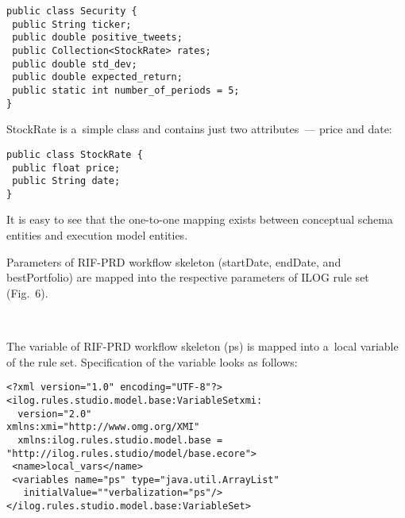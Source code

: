 \begin{multicols}{2}
{\vspace*{-2pt}

\noindent
  \begin{verbatim}
public class Security {
 public String ticker;
 public double positive_tweets;
 public Collection<StockRate> rates;
 public double std_dev;
 public double expected_return;
 public static int number_of_periods = 5;
}	
\end{verbatim}

\vspace*{-2pt}

{\sf StockRate} is a~simple class and contains just two attributes~--- price and date:

\vspace*{-2pt}

\noindent
  \begin{verbatim}
public class StockRate {
 public float price;
 public String date;
}
\end{verbatim}

\vspace*{-2pt}

  It is easy to see that the one-to-one mapping exists between conceptual schema
entities and execution model entities.

  Parameters of RIF-PRD workflow skeleton ({\sf startDate}, {\sf endDate}, and
{\sf bestPortfolio}) are mapped into the respective parameters of ILOG rule set
(Fig.~6).

\begin{figure*} %
\vspace*{1pt}
 \begin{center}
 \mbox{%
 \epsfxsize=115mm
 }
 \end{center}
 \vspace*{-9pt}
  \end{figure*}

  The variable of RIF-PRD workflow skeleton ({\sf ps}) is mapped into a~local variable
of the rule set. Specification of the variable looks as follows:

\vspace*{-2pt}

\noindent
  \begin{verbatim}
<?xml version="1.0" encoding="UTF-8"?>
<ilog.rules.studio.model.base:VariableSetxmi:
  version="2.0"
xmlns:xmi="http://www.omg.org/XMI"
  xmlns:ilog.rules.studio.model.base =
"http://ilog.rules.studio/model/base.ecore">
 <name>local_vars</name>
 <variables name="ps" type="java.util.ArrayList"
   initialValue=""verbalization="ps"/>
</ilog.rules.studio.model.base:VariableSet>
\end{verbatim}

}
\end{multicols}
